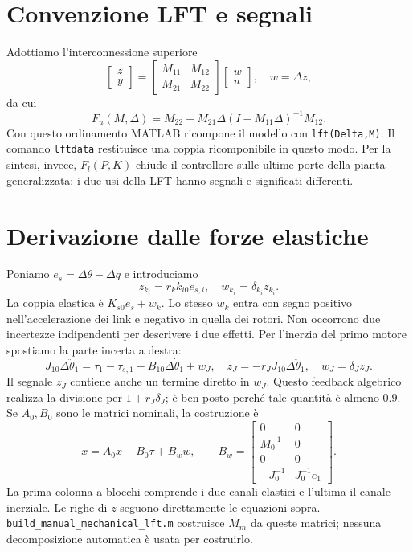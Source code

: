 \section{Convenzione LFT e segnali}
Adottiamo l'interconnessione superiore
\[
\begin{bmatrix}z\\y\end{bmatrix}=
\begin{bmatrix}M_{11}&M_{12}\\M_{21}&M_{22}\end{bmatrix}
\begin{bmatrix}w\\u\end{bmatrix},\quad w=\Delta z,
\]
da cui
\[
F_u(M,\Delta)=M_{22}+M_{21}\Delta(I-M_{11}\Delta)^{-1}M_{12}.
\]
Con questo ordinamento MATLAB ricompone il modello con
\texttt{lft(Delta,M)}. Il comando \texttt{lftdata} restituisce una coppia
ricomponibile in questo modo. Per la sintesi, invece, $F_l(P,K)$ chiude
il controllore sulle ultime porte della pianta generalizzata: i due usi
della LFT hanno segnali e significati differenti.
\section{Derivazione dalle forze elastiche}
Poniamo $e_s=\Delta\theta-\Delta q$ e introduciamo
\[
z_{k_i}=r_k k_{i0}e_{s,i},\quad w_{k_i}=\delta_{k_i}z_{k_i}.
\]
La coppia elastica è $K_{s0}e_s+w_k$. Lo stesso $w_k$ entra con segno
positivo nell'accelerazione dei link e negativo in quella dei rotori.
Non occorrono due incertezze indipendenti per descrivere i due effetti.
Per l'inerzia del primo motore spostiamo la parte incerta a destra:
\[
J_{10}\Delta\ddot\theta_1=\tau_1-\tau_{s,1}-B_{10}\Delta\dot\theta_1+w_J,
\quad z_J=-r_JJ_{10}\Delta\ddot\theta_1,\quad w_J=\delta_Jz_J.
\]
Il segnale $z_J$ contiene anche un termine diretto in $w_J$. Questo
feedback algebrico realizza la divisione per $1+r_J\delta_J$;
è ben posto perché tale quantità è almeno $0.9$.
Se $A_0,B_0$ sono le matrici nominali, la costruzione è
\[
\dot x=A_0x+B_0\tau+B_ww,\qquad
B_w=\begin{bmatrix}0&0\\M_0^{-1}&0\\0&0\\-J_0^{-1}&J_0^{-1}e_1\end{bmatrix}.
\]
La prima colonna a blocchi comprende i due canali elastici e l'ultima
il canale inerziale. Le righe di $z$ seguono direttamente le equazioni sopra.
\texttt{build\_manual\_mechanical\_lft.m} costruisce $M_m$ da queste matrici;
nessuna decomposizione automatica è usata per costruirlo.
